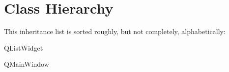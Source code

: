 \section{Class Hierarchy}
This inheritance list is sorted roughly, but not completely, alphabetically\+:\begin{DoxyCompactList}
\item Q\+List\+Widget\begin{DoxyCompactList}
\item {}
\end{DoxyCompactList}
\item Q\+Main\+Window\begin{DoxyCompactList}
\item {}
\end{DoxyCompactList}
\end{DoxyCompactList}
